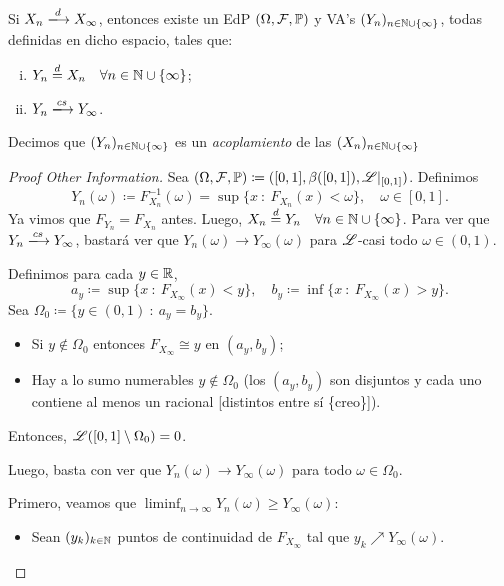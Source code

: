 \begin{theorem}
	Si $X_{n} \xlongrightarrow{d} X_{\infty}$, entonces existe un EdP $(\Omega, \mathcal{F}, \mathbb{P})$ y VA's $(Y_{n})_{n \in \mathbb{N} \cup \{\infty\}}$, todas definidas en dicho espacio, tales que:
	\begin{enumerate}[i)]
		\item $Y_{n} \stackrel{d}{=} X_{n} \quad \forall n \in \mathbb{N} \cup \{\infty\}$;

		\item $Y_{n} \xlongrightarrow{cs} Y_{\infty}$.
	\end{enumerate}
	Decimos que $(Y_{n})_{n \in \mathbb{N} \cup \{\infty\}}$ es un \textit{acoplamiento} de las $(X_{n})_{n \in \mathbb{N} \cup \{\infty\}}$
\end{theorem}
\begin{proof}[Proof Other Information]
	Sea $(\Omega, \mathcal{F}, \mathbb{P}) \coloneq ([0,1], \beta([0,1]), \mathscr{L}|_{[0,1]})$. Definimos 
	\[ Y_{n}(\omega) \coloneq F_{X_{n}}^{-1}(\omega) = \sup \{x \ : \ F_{X_{n}}(x) < \omega\},\quad \omega \in [0,1]. \]
	Ya vimos que $F_{Y_{n}} = F_{X_{n}}$ antes. Luego, $X_{n} \stackrel{d}{=} Y_{n} \quad \forall n \in \mathbb{N} \cup \{\infty\}$. Para ver que $Y_{n} \xlongrightarrow{cs} Y_{\infty}$, bastará ver que $Y_{n}(\omega) \longrightarrow Y_{\infty}(\omega)$ para $\mathscr{L}$-casi todo $\omega \in (0,1)$. \par
	Definimos para cada $y \in \mathbb{R}$,
	\[ a_{y} \coloneq \sup \{x \ : \ F_{X_{\infty}}(x) < y\}, \quad b_{y} \coloneq \inf \{x \ : \ F_{X_{\infty}}(x) > y\}. \]
	Sea $\Omega_{0} \coloneq \{y \in (0,1) \ : \ a_{y} = b_{y}\}$.
	\begin{itemize}
		\item Si $y \not\in \Omega_{0}$ entonces $F_{X_{\infty}} \cong y$ en $(a_{y}, b_{y})$;

		\item Hay a lo sumo numerables $y \not\in \Omega_{0}$ (los $(a_{y}, b_{y})$ son disjuntos y cada uno contiene al menos un racional [distintos entre sí \{creo\}]).
	\end{itemize}
	Entonces, $\mathscr{L}([0,1] \setminus \Omega_{0}) = 0$. \par
	Luego, basta con ver que $Y_{n}(\omega) \longrightarrow Y_{\infty}(\omega)$ para todo $\omega \in \Omega_{0}$. \par
	Primero, veamos que $\liminf_{n \to \infty} Y_{n}(\omega) \geq Y_{\infty}(\omega)$:
	\begin{itemize}
		\item Sean $(y_{k})_{k \in \mathbb{N}}$ puntos de continuidad de $F_{X_{\infty}}$ tal que $y_{k} \nearrow Y_{\infty}(\omega)$.
		

\end{itemize}
\end{proof}
